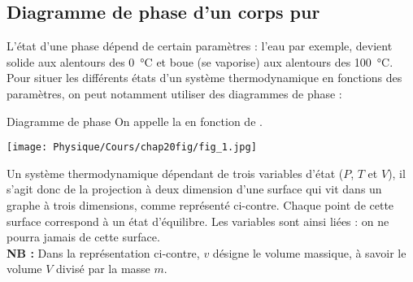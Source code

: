 \documentclass[a4paper,french,bookmarks]{article}
\begin{document}
\begin{center}
\end{center}

\subsection{Diagramme de phase d'un corps pur}

L'état d'une phase dépend de certain paramètres : l'eau par exemple, devient solide aux alentours des \SI{0}{\celsius} et boue (se vaporise) aux alentours des \SI{100}{\celsius}. Pour situer les différents états d'un système thermodynamique en fonctions des paramètres, on peut notamment utiliser des diagrammes de phase :

\begin{definition}{Diagramme de phase}{}
    On appelle  la  en fonction de . 
\end{definition}

\begin{minipage}{0.45\linewidth}
    \begin{center}
        \texttt{[image: Physique/Cours/chap20fig/fig\_1.jpg]}
    \end{center}
\end{minipage}
%
\hfill
%
\begin{minipage}{0.5\linewidth}
    Un système thermodynamique dépendant de trois variables d'état ($P$, $T$ et $V$), il s'agit donc de la projection à deux dimension d'une surface qui vit dans un graphe à trois dimensions, comme représenté ci-contre. Chaque point de cette surface correspond à un état d'équilibre. Les variables sont ainsi liées : on ne pourra jamais  de cette surface.\\
    
    {\sffamily \bfseries NB :} Dans la représentation ci-contre, $v$ désigne le volume massique, à savoir le volume $V$ divisé par la masse $m$.
\end{minipage}
\end{document}
